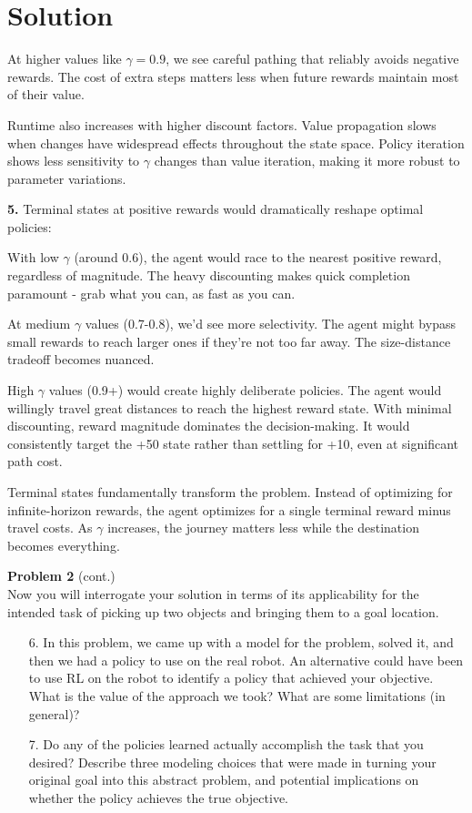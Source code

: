 \documentclass[submit]{../harvardml}
\newenvironment{solution}
  {\color{blue}\section*{Solution}}
{}
\begin{document}
\begin{solution}
At higher values like $\gamma = 0.9$, we see careful pathing that reliably avoids negative rewards. The cost of extra steps matters less when future rewards maintain most of their value.

Runtime also increases with higher discount factors. Value propagation slows when changes have widespread effects throughout the state space. Policy iteration shows less sensitivity to $\gamma$ changes than value iteration, making it more robust to parameter variations.

\textbf{5.} Terminal states at positive rewards would dramatically reshape optimal policies:

With low $\gamma$ (around 0.6), the agent would race to the nearest positive reward, regardless of magnitude. The heavy discounting makes quick completion paramount - grab what you can, as fast as you can.

At medium $\gamma$ values (0.7-0.8), we'd see more selectivity. The agent might bypass small rewards to reach larger ones if they're not too far away. The size-distance tradeoff becomes nuanced.

High $\gamma$ values (0.9+) would create highly deliberate policies. The agent would willingly travel great distances to reach the highest reward state. With minimal discounting, reward magnitude dominates the decision-making. It would consistently target the +50 state rather than settling for +10, even at significant path cost.

Terminal states fundamentally transform the problem. Instead of optimizing for infinite-horizon rewards, the agent optimizes for a single terminal reward minus travel costs. As $\gamma$ increases, the journey matters less while the destination becomes everything.
\end{solution}

\newpage

\begin{framed}
\textbf{Problem 2} (cont.)\\

Now you will interrogate your solution in terms of its applicability
for the intended task of picking up two objects and bringing them to a
goal location.

\begin{itemize}

  \item[6.] In this problem, we came up with a model for the problem,
    solved it, and then we had a policy to use on the real robot.  An
    alternative could have been to use RL on the robot to identify a
    policy that achieved your objective.  What is the value of the
    approach we took?  What are some limitations (in general)? 

  \item[7.] Do any of the policies learned actually accomplish the task
    that you desired? Describe three modeling choices that were made in
    turning your original goal into this abstract problem, and
    potential implications on whether the policy achieves the true objective.

\end{itemize}

\end{framed}
\end{document}

